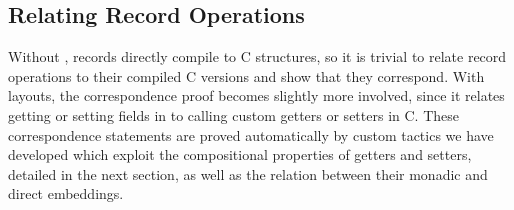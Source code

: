 





\subsection{Relating Record Operations}\label{sec:record-lemmas}

Without \Dargent, records directly compile to C structures, so
it is trivial to relate
\cogent record operations to their compiled C versions
and show that they correspond.
With layouts, the correspondence proof becomes slightly more involved, since it relates
getting or setting fields in \cogent to calling custom getters or setters
in C. These correspondence statements are proved automatically by custom tactics we have developed 
which exploit the compositional properties of getters and setters, detailed in the next section,
as well as the relation between their monadic and direct embeddings.


